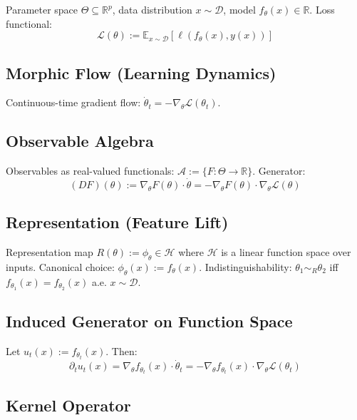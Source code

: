 \documentclass[12pt, oneside]{article}
\begin{document}
Parameter space $\Theta \subseteq \mathbb{R}^p$, data distribution $x \sim \mathcal{D}$, model $f_\theta(x) \in \mathbb{R}$. Loss functional:
\begin{equation}
\mathcal{L}(\theta) := \mathbb{E}_{x \sim \mathcal{D}} [\ell(f_\theta(x), y(x))]
\end{equation}

\subsection{Morphic Flow (Learning Dynamics)}

Continuous-time gradient flow: $\dot{\theta}_t = -\nabla_\theta \mathcal{L}(\theta_t)$.

\subsection{Observable Algebra}

Observables as real-valued functionals: $\mathcal{A} := \{ F: \Theta \rightarrow \mathbb{R} \}$. Generator:
\begin{equation}
(DF)(\theta) := \nabla_\theta F(\theta) \cdot \dot{\theta} = -\nabla_\theta F(\theta) \cdot \nabla_\theta \mathcal{L}(\theta)
\end{equation}

\subsection{Representation (Feature Lift)}

Representation map $R(\theta) := \phi_\theta \in \mathcal{H}$ where $\mathcal{H}$ is a linear function space over inputs. Canonical choice: $\phi_\theta(x) := f_\theta(x)$. Indistinguishability: $\theta_1 \sim_R \theta_2$ iff $f_{\theta_1}(x) = f_{\theta_2}(x)$ a.e. $x \sim \mathcal{D}$.

\subsection{Induced Generator on Function Space}

Let $u_t(x) := f_{\theta_t}(x)$. Then:
\begin{equation}
\partial_t u_t(x) = \nabla_\theta f_{\theta_t}(x) \cdot \dot{\theta}_t = -\nabla_\theta f_{\theta_t}(x) \cdot \nabla_\theta \mathcal{L}(\theta_t)
\end{equation}

\subsection{Kernel Operator}
\end{document}
